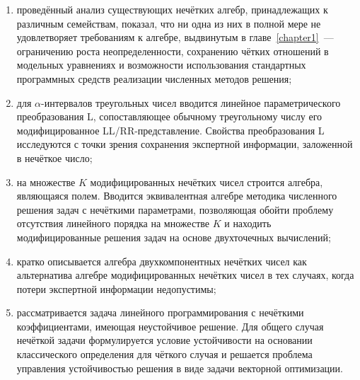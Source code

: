 \begin{enumerate}
  \item проведённый анализ существующих нечётких алгебр, принадлежащих к различным семействам, показал, что ни одна из них в полной мере не удовлетворяет требованиям к алгебре, выдвинутым в главе~\ref{chapter1}~--- ограничению роста неопределенности, сохранению чётких отношений в модельных уравнениях и возможности использования стандартных программных средств реализации численных методов решения;
  \item для $\alpha$-интервалов треугольных чисел вводится линейное параметрического преобразования L, сопоставляющее обычному треугольному числу его модифицированное LL/RR-представление. Свойства преобразования L исследуются с точки зрения сохранения экспертной информации, заложенной в нечёткое число;
  \item на множестве $K$ модифицированных нечётких чисел строится алгебра, являющаяся полем. Вводится эквивалентная алгебре методика численного решения задач с нечёткими параметрами, позволяющая обойти проблему отсутствия линейного порядка на множестве $K$ и находить модифицированные решения задач на основе двухточечных вычислений;
  \item кратко описывается алгебра двухкомпонентных нечётких чисел как альтернатива алгебре модифицированных нечётких чисел в тех случаях, когда потери экспертной информации недопустимы;
  \item рассматривается задача линейного программирования с нечёткими коэффициентами, имеющая неустойчивое решение. Для общего случая нечёткой задачи формулируется условие устойчивости на основании классического определения для чёткого случая и решается проблема управления устойчивостью решения в виде задачи векторной оптимизации.
\end{enumerate}